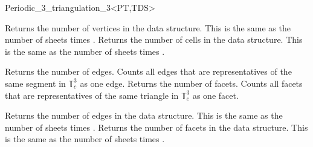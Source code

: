 \begin{ccRefClass}{Periodic_3_triangulation_3<PT,TDS>}
\begin{ccAdvanced}
{Returns the number of vertices in the data structure. This is the
  same as the number of sheets times . }
\ccGlue
{}
{Returns the number of cells in the data structure. This is the same
  as the number of sheets times .}
\end{ccAdvanced}


{Returns the number of edges. Counts all edges that are
  representatives of the same segment in $\mathbb T_c^3$ as one edge.}
\ccGlue
{}
{Returns the number of facets. Counts all facets that are
  representatives of the same triangle in $\mathbb T_c^3$ as one
  facet.}

\begin{ccAdvanced}
{Returns the number of edges in the data structure. This is the same
  as the number of sheets times .}
\ccGlue
{}
{Returns the number of facets in the data structure. This is the same
  as the number of sheets times .}
\end{ccAdvanced}



\end{ccRefClass}
